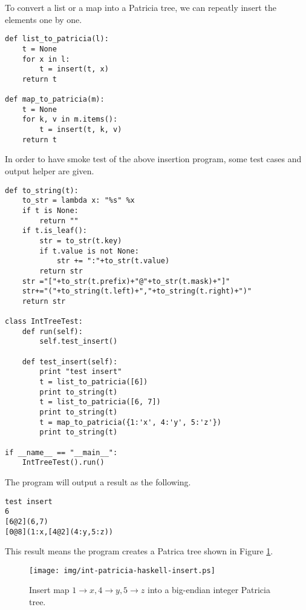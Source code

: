\documentclass{article}
\begin{document}
To convert a list or a map into a Patricia tree, we can repeatly
insert the elements one by one.

\begin{lstlisting}
def list_to_patricia(l):
    t = None
    for x in l:
        t = insert(t, x)
    return t

def map_to_patricia(m):
    t = None
    for k, v in m.items():
        t = insert(t, k, v)
    return t
\end{lstlisting}

In order to have smoke test of the above insertion program, some test
cases and output helper are given.

\begin{lstlisting}
def to_string(t):
    to_str = lambda x: "%s" %x
    if t is None:
        return ""
    if t.is_leaf():
        str = to_str(t.key)
        if t.value is not None:
            str += ":"+to_str(t.value)
        return str
    str ="["+to_str(t.prefix)+"@"+to_str(t.mask)+"]"
    str+="("+to_string(t.left)+","+to_string(t.right)+")"
    return str

class IntTreeTest:
    def run(self):
        self.test_insert()

    def test_insert(self):
        print "test insert"
        t = list_to_patricia([6])
        print to_string(t)
        t = list_to_patricia([6, 7])
        print to_string(t)
        t = map_to_patricia({1:'x', 4:'y', 5:'z'})
        print to_string(t)

if __name__ == "__main__":
    IntTreeTest().run()
\end{lstlisting}

The program will output a result as the following.

\begin{verbatim}
test insert
6
[6@2](6,7)
[0@8](1:x,[4@2](4:y,5:z))
\end{verbatim}

This result means the program creates a Patrica tree shown in 
Figure \ref{fig:int-patricia-haskell-insert}.

\begin{figure}[htbp]
       \begin{center}
	\texttt{[image: img/int-patricia-haskell-insert.ps]}
        \caption{Insert map $1 \rightarrow x, 4 \rightarrow y, 5 \rightarrow z$ into a big-endian integer Patricia tree.}
        \label{fig:int-patricia-haskell-insert}
       \end{center}
\end{figure}
\end{document}
